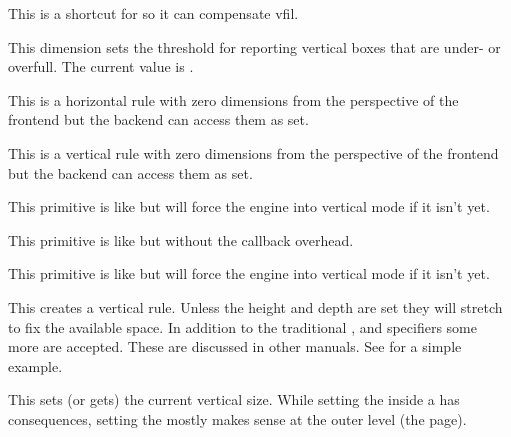 \startoldprimitive[title={\prm {vfilneg}}]

This is a shortcut for  so it can compensate \prm
{vfil}.

\stopoldprimitive

\startoldprimitive[title={\prm {vfuzz}}]

This dimension sets the threshold for reporting vertical boxes that are under- or
overfull. The current value is \the \vfuzz.

\stopoldprimitive

\startnewprimitive[title={\prm {virtualhrule}}]

This is a horizontal rule with zero dimensions from the perspective of the
frontend but the backend can access them as set.

\stopnewprimitive

\startnewprimitive[title={\prm {virtualvrule}}]

This is a vertical rule with zero dimensions from the perspective of the frontend
but the backend can access them as set.

\stopnewprimitive

\startoldprimitive[title={\prm {vkern}}]

This primitive is like  but will force the engine into vertical mode
if it isn't yet.

\stopoldprimitive

\startnewprimitive[title={\prm {vpack}}]

This primitive is like  but without the callback overhead.

\stopnewprimitive

\startnewprimitive[title={\prm {vpenalty}}]

This primitive is like  but will force the engine into vertical
mode if it isn't yet.

\stopnewprimitive

\startoldprimitive[title={\prm {vrule}}]

This creates a vertical rule. Unless the height and depth are set they will
stretch to fix the available space. In addition to the traditional ,
 and  specifiers some more are accepted. These are
discussed in other manuals. See  for a simple example.

\stopoldprimitive

\startoldprimitive[title={\prm {vsize}}]

This sets (or gets) the current vertical size. While setting the 
inside a  has consequences, setting the  mostly makes
sense at the outer level (the page).

